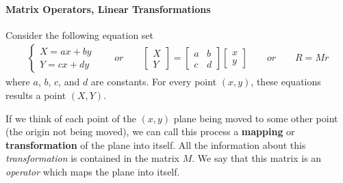             \paragraph{Matrix Operators, Linear Transformations} %
            \label{par:Matrix Operators, Linear Transformations}
            Consider the following equation set 
            \begin{align}
                \label{eq:transformation:1}
                \begin{cases}
                    X = ax + by \\
                    Y = cx + dy
                \end{cases}
                \qquad or \qquad 
                \begin{bmatrix}
                    X \\ Y
                \end{bmatrix} = 
                \begin{bmatrix}
                    a & b \\
                    c & d
                \end{bmatrix}
                \begin{bmatrix}
                    x \\ y
                \end{bmatrix}
                \qquad or \qquad 
                R = Mr
            \end{align}
            where $a$, $b$, $c$, and $d$ are constants.
            For every point $(x,y)$, these equations results a point $(X, Y)$.

            If we think of each point of the $(x, y)$ plane being moved to some other 
            point (the origin not being moved), we can call this 
            process a \textbf{mapping} or \textbf{transformation} of the plane into itself. All the information 
            about this \textit{transformation} is contained in the matrix $M$. We say that this matrix is 
            an \textit{operator} which maps the plane into itself.
            
